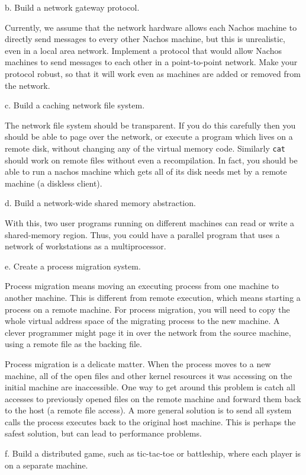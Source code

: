 \begin{description}
\begin{description}
\item{b.} Build a network gateway protocol.  

Currently, we assume that 
the network hardware allows each Nachos machine to directly send messages to
every other Nachos machine, but this is unrealistic, even in a local 
area network.  Implement a protocol that would allow Nachos 
machines to send messages to each other in a point-to-point network.
Make your protocol robust, so that it will work even as machines 
are added or removed from the network.

\item{c.} Build a caching network file system.

The network file system should be transparent.  If you do this carefully
then you should be able to page over the network, or execute a program
which lives on a remote disk, without changing any of the virtual
memory code.  Similarly {\tt cat} should work on remote files without
even a recompilation.  In fact, you should be able to run a nachos machine
which gets all of its disk needs met by a remote machine (a diskless
client).

\item{d.} Build a network-wide shared memory abstraction.

With this, two user programs running on different machines can
read or write a shared-memory region.  Thus, you could have a parallel
program that uses a network of workstations as a multiprocessor.

\item{e.} Create a process migration system.

Process migration means moving an executing process from one machine
to another machine.  This is different from remote execution, which means
starting a process on a remote machine.  For process migration, you will
need to copy the whole virtual address space of the migrating process
to the new machine.  A clever programmer might page it in over
the network from the source machine, using a remote file as the
backing file.

Process migration is a delicate matter.  When the process moves to a
new machine, all of the open files and other kernel resources it
was accessing on the initial machine are inaccessible.  One way to
get around this problem is catch all accesses to previously opened
files on the remote machine and forward them back to the host (a remote
file access).  A more general solution is to send all system calls the
process executes back to the original host machine.  This is perhaps the
safest solution, but can lead to performance problems.

\item{f.} Build a distributed game, such as tic-tac-toe or battleship,
where each player is on a separate machine.

\end{description}
\end{description}


